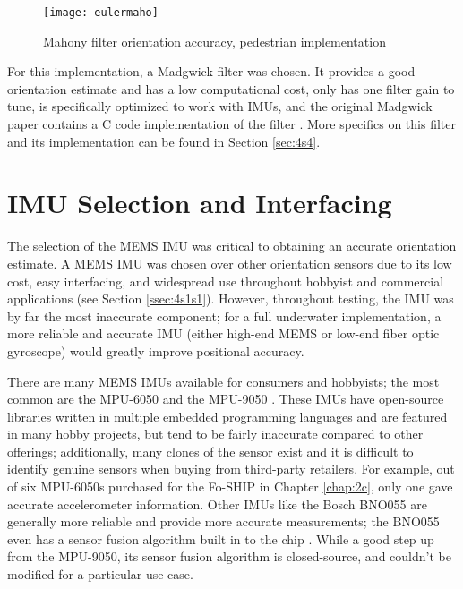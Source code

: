 \documentclass[12pt,a4paper]{report}
\begin{document}
\begin{figure}[htbp]
	\centering
	\texttt{[image: eulermaho]}
	\caption{Mahony filter orientation accuracy, pedestrian implementation  \cite{sfcomp}}
	\label{fig:eulermaho}
\end{figure}

For this implementation, a Madgwick filter was chosen. It provides a good orientation estimate and has a low computational cost, only has one filter gain to tune, is specifically optimized to work with IMUs, and the original Madgwick paper contains a C code implementation of the filter \cite{madgwick}. More specifics on this filter and its implementation can be found in Section \ref{sec:4s4}.

\pagebreak

\section{IMU Selection and Interfacing} \label{sec:4s2}
The selection of the MEMS IMU was critical to obtaining an accurate orientation estimate. A MEMS IMU was chosen over other orientation sensors due to its low cost, easy interfacing, and widespread use throughout hobbyist and commercial applications (see Section \ref{ssec:4s1s1}). However, throughout testing, the IMU was by far the most inaccurate component; for a full underwater implementation, a more reliable and accurate IMU (either high-end MEMS or low-end fiber optic gyroscope) would greatly improve positional accuracy. 

There are many MEMS IMUs available for consumers and hobbyists; the most common are the MPU-6050 and the MPU-9050 \cite{mpu6050}. These IMUs have open-source libraries written in multiple embedded programming languages and are featured in many hobby projects, but tend to be fairly inaccurate compared to other offerings; additionally, many clones of the sensor exist and it is difficult to identify genuine sensors when buying from third-party retailers. For example, out of six MPU-6050s purchased for the Fo-SHIP in Chapter \ref{chap:2c}, only one gave accurate accelerometer information. Other IMUs like the Bosch BNO055 are generally more reliable and provide more accurate measurements; the BNO055 even has a sensor fusion algorithm built in to the chip \cite{bno055}. While a good step up from the MPU-9050, its sensor fusion algorithm is closed-source, and couldn't be modified for a particular use case. 
\end{document}
